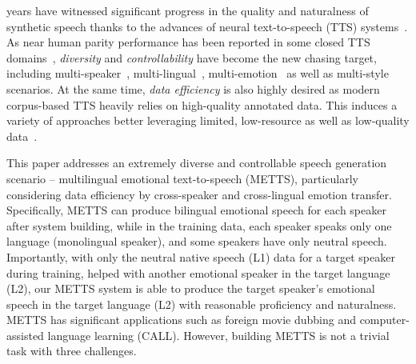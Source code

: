 \documentclass[journal,comsoc]{IEEEtran}
\begin{document}
 years have witnessed significant progress in the quality and naturalness of synthetic speech thanks to the advances of neural text-to-speech (TTS) systems~\cite{DBLP:conf/interspeech/WangSSWWJYXCBLA17,DBLP:conf/nips/RenRTQZZL19,DBLP:conf/aaai/Li0LZL19,DBLP:conf/iclr/Chen0LLQZL21,DBLP:conf/interspeech/JeongKCCK21,DBLP:conf/icassp/WeissSBMK21,DBLP:conf/icml/KimKS21,DBLP:journals/taslp/LeiYWX22}. As near human parity performance has been reported in some closed TTS domains~\cite{DBLP:conf/acl/0006TQZL22}, \textit{diversity} and \textit{controllability} have become the new chasing target, including multi-speaker~\cite{DBLP:conf/icassp/WuSLW22}, multi-lingual~\cite{DBLP:conf/interspeech/ZhangWZWCSJRR19}, multi-emotion~\cite{DBLP:journals/taslp/LeiYWX22} as well as multi-style~\cite{DBLP:conf/icml/MinLYH21} scenarios. At the same time, \textit{data efficiency} is also highly desired as modern corpus-based TTS heavily relies on high-quality annotated data. This induces a variety of approaches better leveraging limited, low-resource as well as low-quality data~\cite{DBLP:conf/icassp/LiuYSY22,DBLP:conf/icassp/Yan0LQZSL21,DBLP:conf/interspeech/SaekiTY22}. 

This paper addresses an extremely diverse and controllable speech generation scenario -- multilingual emotional text-to-speech (METTS), particularly considering data efficiency by cross-speaker and cross-lingual emotion transfer. Specifically, METTS can produce bilingual emotional speech for each speaker after system building, while in the training data, each speaker speaks only one language (monolingual speaker), and some speakers have only neutral speech. Importantly, with only the neutral native speech (L1) data for a target speaker during training, helped with another emotional speaker in the target language (L2), our METTS system is able to produce the target speaker's emotional speech in the target language (L2) with reasonable proficiency and naturalness. METTS has significant applications such as foreign movie dubbing and computer-assisted language learning (CALL). However, building METTS is not a trivial task with three challenges.
\end{document}
